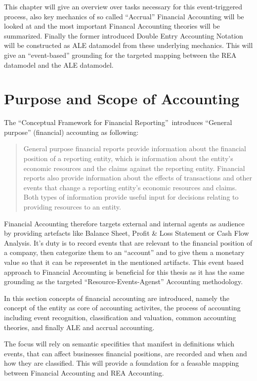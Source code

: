 This chapter will give an overview over tasks necessary for this event-triggered process, also key mechanics of so called \enquote{Accrual} Financial Accounting will be looked at and the most important Financal Accounting theories will be summarized.
Finally the former introduced Double Entry Accounting Notation will be constructed as ALE datamodel from these underlying mechanics.
This will give an \enquote{event-based} grounding for the targeted mapping between the REA datamodel and the ALE datamodel.

\section{Purpose and Scope of Accounting}\label{sec:Finacc-Purpose}

The \enquote{Conceptual Framework for Financial Reporting}\ introduces \enquote{General purpose} (financial) accounting as following:
\blockquote{General purpose financial reports provide information about the financial position of a reporting entity, which is information about the entity's economic resources and the claims against the reporting entity. Financial reports also provide information about the effects of transactions and other events that change a reporting entity's economic resources and claims. Both types of information provide useful input for decisions relating to providing resources to an entity. \cite[Section 1.12]{IASBFramwork}}

Financial Accounting therefore targets external and internal agents as audience by providing artefacts like Balance Sheet, Profit \& Loss Statement or Cash Flow Analysis.
It's duty is to record events that are relevant to the financial position of a company, then categorize them to an \enquote{account} and to give them a monetary value so that it can be representet in the mentioned artifacts.
This event based approach to Financial Accounting is beneficial for this thesis as it has the same grounding as the targeted \enquote{Resource-Events-Agenst} Accounting methodology.

In this section concepts of financial accounting are introduced, namely the concept of the entity as core of accounting activites, the process of accounting including event recognition, classification and valuation, common accounting theories, and finally ALE and accrual accounting.

The focus will rely on semantic specifities that manifest in definitions which events, that can affect businesses financial positions, are recorded and when and how they are classified.
This will provide a foundation for a feasable mapping between Financial Accounting and REA Accounting.

